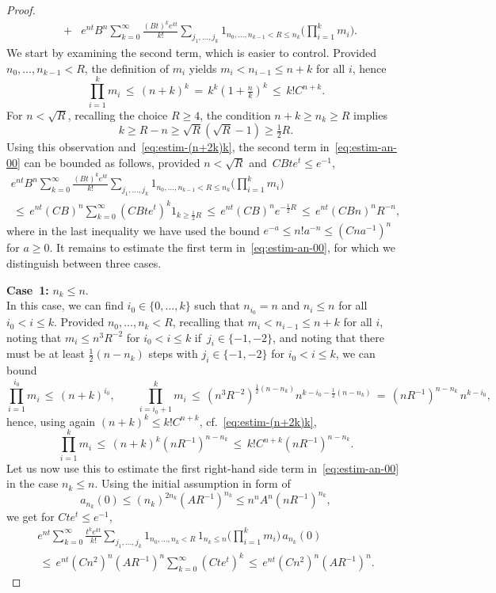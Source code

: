 \documentclass[10pt,a4paper]{amsart}
\begin{document}
\begin{proof}
\begin{eqnarray}
&+&e^{nt}B^n\sum_{k=0}^\infty \tfrac{(Bt)^ke^{kt}}{k!}\sum_{j_1,\ldots,j_k}1_{n_0,\ldots,n_{k-1}<R\le n_k}\Big(\prod_{i=1}^km_i\Big).\label{eq:estim-an-00}
\end{eqnarray}
We start by examining the second term, which is easier to control. Provided $n_0,\ldots,n_{k-1}<R$, the definition of $m_i$ yields $m_i< n_{i-1}\le n+k$ for all $i$, hence 
\begin{equation}\label{eq:estim-(n+2k)k}
\prod_{i=1}^km_i\,\le\,(n+k)^k\,=\,k^k(1+\tfrac{n}{k})^k\,\le\,k!C^{n+k}.
\end{equation}
For $n<\sqrt R$, recalling the choice $R\ge4$, the condition $n+k\ge n_k\ge R$ implies
\[k\ge R-n\ge \sqrt R(\sqrt R-1)\ge\tfrac12R.\]
Using this observation and~\eqref{eq:estim-(n+2k)k}, the second term in~\eqref{eq:estim-an-00} can be bounded as follows, provided $n<\sqrt R$ and~$CBte^{t}\le e^{-1}$,
\begin{multline}\label{eq:red-an-hier}
e^{nt}B^n\sum_{k=0}^\infty \tfrac{(Bt)^ke^{kt}}{k!}\sum_{j_1,\ldots,j_k}1_{n_0,\ldots,n_{k-1}<R\le n_k}\Big(\prod_{i=1}^km_i\Big)\\
\,\le\,e^{nt}(CB)^n\sum_{k=0}^\infty (CBte^t)^k1_{k\ge\frac12R}
\,\le\,e^{nt}(CB)^ne^{-\frac12R}\,\le\,e^{nt}(CBn)^nR^{-n},
\end{multline}
where in the last inequality we have used the bound $e^{-a}\le n!a^{-n}\le (Cna^{-1})^n$ for $a\ge0$.
It remains to estimate the first term in~\eqref{eq:estim-an-00}, for which we distinguish between three cases.

\medskip\noindent
{\bf Case~1:} $n_k\le n$.\\
In this case, we can find $i_0\in\{0,\ldots,k\}$ such that $n_{i_0}=n$ and $n_i\le n$ for all $i_0<i\le k$. Provided $n_0,\ldots,n_k<R$, recalling that $m_i< n_{i-1}\le n+k$ for all $i$, noting that $m_i\le n^3R^{-2}$ for $i_0<i\le k$ if~$j_i\in\{-1,-2\}$, and noting that there must be at least $\frac12(n-n_k)$ steps with $j_i\in\{-1,-2\}$ for $i_0<i\le k$, we can bound
\[\prod_{i=1}^{i_0}m_i\,\le\,(n+k)^{i_0},\qquad\prod_{i=i_0+1}^{k}m_i\,\le\,(n^3R^{-2})^{\frac12(n-n_k)}n^{k-i_0-\frac12(n-n_k)}\,=\,(nR^{-1})^{n-n_k}\,n^{k-i_0},\]
hence, using again $(n+k)^k\le k!C^{n+k}$, cf.~\eqref{eq:estim-(n+2k)k},
\[\prod_{i=1}^{k}m_i\,\le\,(n+k)^{k}(nR^{-1})^{n-n_k}\,\le\,k!C^{n+k}(nR^{-1})^{n-n_k}.\]
Let us now use this to estimate the first right-hand side term in~\eqref{eq:estim-an-00} in the case $n_k\le n$. Using the initial assumption in form of
\[a_{n_k}(0)\le (n_k)^{2n_k}(AR^{-1})^{n_k}\le n^nA^n(nR^{-1})^{n_k},\]
we get for $Cte^{t}\le e^{-1}$,
\begin{multline*}
e^{nt}\sum_{k=0}^\infty \tfrac{t^ke^{kt}}{k!}\sum_{j_1,\ldots,j_k}1_{n_0,\ldots,n_k<R}\,1_{n_k\le n}\Big(\prod_{i=1}^km_i\Big)\,a_{n_k}(0)\\[-2mm]
\,\le\,e^{nt}(Cn^2)^n(AR^{-1})^{n}\sum_{k=0}^\infty (Cte^{t})^k
\,\le\,e^{nt}(Cn^2)^n(AR^{-1})^{n}.
\end{multline*}


\end{proof}
\end{document}
